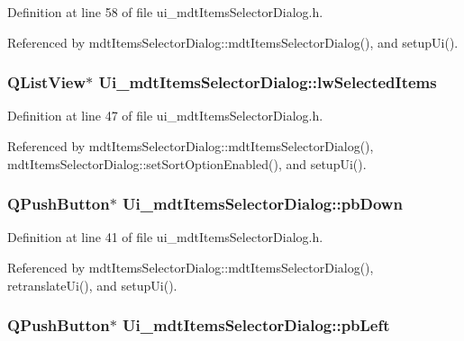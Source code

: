 Definition at line 58 of file ui\-\_\-mdt\-Items\-Selector\-Dialog.\-h.



Referenced by mdt\-Items\-Selector\-Dialog\-::mdt\-Items\-Selector\-Dialog(), and setup\-Ui().

\hypertarget{class_ui__mdt_items_selector_dialog_ae73e914dd34109a083c514868ebf581c}{
\subsubsection[{lw\-Selected\-Items}]{\setlength{\rightskip}{0pt plus 5cm}Q\-List\-View$\ast$ Ui\-\_\-mdt\-Items\-Selector\-Dialog\-::lw\-Selected\-Items}}\label{class_ui__mdt_items_selector_dialog_ae73e914dd34109a083c514868ebf581c}


Definition at line 47 of file ui\-\_\-mdt\-Items\-Selector\-Dialog.\-h.



Referenced by mdt\-Items\-Selector\-Dialog\-::mdt\-Items\-Selector\-Dialog(), mdt\-Items\-Selector\-Dialog\-::set\-Sort\-Option\-Enabled(), and setup\-Ui().

\hypertarget{class_ui__mdt_items_selector_dialog_a52172d7cd28b07d31d1a45f1e6492b7a}{
\subsubsection[{pb\-Down}]{\setlength{\rightskip}{0pt plus 5cm}Q\-Push\-Button$\ast$ Ui\-\_\-mdt\-Items\-Selector\-Dialog\-::pb\-Down}}\label{class_ui__mdt_items_selector_dialog_a52172d7cd28b07d31d1a45f1e6492b7a}


Definition at line 41 of file ui\-\_\-mdt\-Items\-Selector\-Dialog.\-h.



Referenced by mdt\-Items\-Selector\-Dialog\-::mdt\-Items\-Selector\-Dialog(), retranslate\-Ui(), and setup\-Ui().

\hypertarget{class_ui__mdt_items_selector_dialog_a27de1ffc1ccd673695cf6902b3af5197}{
\subsubsection[{pb\-Left}]{\setlength{\rightskip}{0pt plus 5cm}Q\-Push\-Button$\ast$ Ui\-\_\-mdt\-Items\-Selector\-Dialog\-::pb\-Left}}\label{class_ui__mdt_items_selector_dialog_a27de1ffc1ccd673695cf6902b3af5197}


